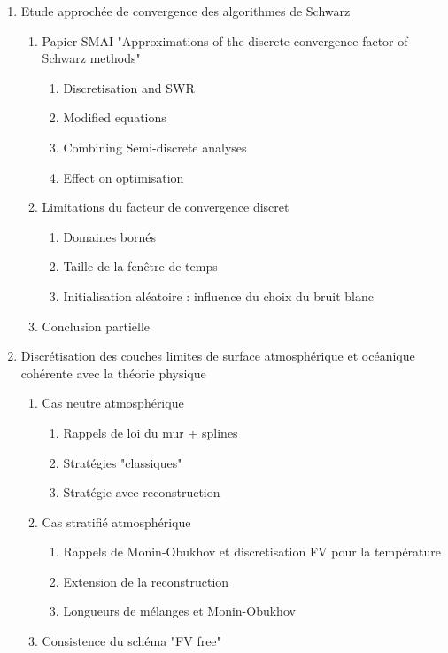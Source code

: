 \documentclass{article}
\begin{document}
\begin{enumerate}
\begin{enumerate}
	\end{enumerate}
\item Etude approchée de convergence des algorithmes de Schwarz
	\begin{enumerate}
		\item Papier SMAI "Approximations of the discrete
			convergence factor of Schwarz methods"
			\begin{enumerate}
					\item Discretisation and SWR
					\item Modified equations
					\item Combining Semi-discrete analyses
					\item Effect on optimisation
			\end{enumerate}
		\item Limitations du facteur de convergence discret
			\begin{enumerate}
				\item Domaines bornés
				\item Taille de la fenêtre de temps
				\item Initialisation aléatoire :
					influence du choix
					du bruit blanc 	
			\end{enumerate}
		\item Conclusion partielle
	\end{enumerate}
\item Discrétisation des couches limites de surface atmosphérique
	et océanique cohérente avec la théorie physique
	\begin{enumerate}
		\item Cas neutre atmosphérique
			\begin{enumerate}
				\item Rappels de loi du mur + splines
				\item Stratégies "classiques"
				\item Stratégie avec reconstruction
			\end{enumerate}
		\item Cas stratifié atmosphérique
			\begin{enumerate}
				\item Rappels de Monin-Obukhov
					et discretisation FV pour 
					la température
				\item Extension de la reconstruction
				\item Longueurs de mélanges et Monin-Obukhov
			\end{enumerate}
		\item Consistence du schéma "FV free"

\end{enumerate}
\end{enumerate}
\end{document}
